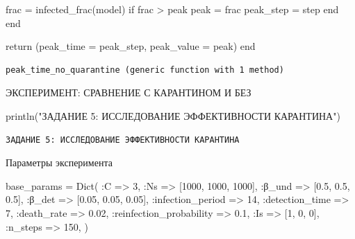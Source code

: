 \documentclass[
  12pt,
  a4paper,
  DIV=11,
  numbers=noendperiod]{scrreprt}
\newenvironment{Shaded}{\begin{snugshade}}{\end{snugshade}}
\newcommand{\ControlFlowTok}[1]{\textcolor[rgb]{0.00,0.23,0.31}{#1}}
\newcommand{\FloatTok}[1]{\textcolor[rgb]{0.68,0.00,0.00}{#1}}
\newcommand{\FunctionTok}[1]{\textcolor[rgb]{0.28,0.35,0.67}{#1}}
\newcommand{\KeywordTok}[1]{\textcolor[rgb]{0.00,0.23,0.31}{#1}}
\newcommand{\NormalTok}[1]{\textcolor[rgb]{0.00,0.23,0.31}{#1}}
\newcommand{\OperatorTok}[1]{\textcolor[rgb]{0.37,0.37,0.37}{#1}}
\newcommand{\StringTok}[1]{\textcolor[rgb]{0.13,0.47,0.30}{#1}}
\begin{document}
\begin{Shaded}
\begin{Highlighting}[]
\NormalTok{        frac }\OperatorTok{=} \FunctionTok{infected\_frac}\NormalTok{(model)}
        \ControlFlowTok{if}\NormalTok{ frac }\OperatorTok{\textgreater{}}\NormalTok{ peak}
\NormalTok{            peak }\OperatorTok{=}\NormalTok{ frac}
\NormalTok{            peak\_step }\OperatorTok{=}\NormalTok{ step}
        \ControlFlowTok{end}
    \ControlFlowTok{end}

    \ControlFlowTok{return}\NormalTok{ (peak\_time }\OperatorTok{=}\NormalTok{ peak\_step, peak\_value }\OperatorTok{=}\NormalTok{ peak)}
\KeywordTok{end}
\end{Highlighting}
\end{Shaded}

\begin{verbatim}
peak_time_no_quarantine (generic function with 1 method)
\end{verbatim}

ЭКСПЕРИМЕНТ: СРАВНЕНИЕ С КАРАНТИНОМ И БЕЗ

\begin{Shaded}
\begin{Highlighting}[]
\FunctionTok{println}\NormalTok{(}\StringTok{"ЗАДАНИЕ 5: ИССЛЕДОВАНИЕ ЭФФЕКТИВНОСТИ КАРАНТИНА"}\NormalTok{)}
\end{Highlighting}
\end{Shaded}

\begin{verbatim}
ЗАДАНИЕ 5: ИССЛЕДОВАНИЕ ЭФФЕКТИВНОСТИ КАРАНТИНА
\end{verbatim}

Параметры эксперимента

\begin{Shaded}
\begin{Highlighting}[]
\NormalTok{base\_params }\OperatorTok{=} \FunctionTok{Dict}\NormalTok{(}
    \OperatorTok{:}\NormalTok{C }\OperatorTok{=\textgreater{}} \FloatTok{3}\NormalTok{,}
    \OperatorTok{:}\NormalTok{Ns }\OperatorTok{=\textgreater{}}\NormalTok{ [}\FloatTok{1000}\NormalTok{, }\FloatTok{1000}\NormalTok{, }\FloatTok{1000}\NormalTok{],}
    \OperatorTok{:}\NormalTok{β\_und }\OperatorTok{=\textgreater{}}\NormalTok{ [}\FloatTok{0.5}\NormalTok{, }\FloatTok{0.5}\NormalTok{, }\FloatTok{0.5}\NormalTok{],}
    \OperatorTok{:}\NormalTok{β\_det }\OperatorTok{=\textgreater{}}\NormalTok{ [}\FloatTok{0.05}\NormalTok{, }\FloatTok{0.05}\NormalTok{, }\FloatTok{0.05}\NormalTok{],}
    \OperatorTok{:}\NormalTok{infection\_period }\OperatorTok{=\textgreater{}} \FloatTok{14}\NormalTok{,}
    \OperatorTok{:}\NormalTok{detection\_time }\OperatorTok{=\textgreater{}} \FloatTok{7}\NormalTok{,}
    \OperatorTok{:}\NormalTok{death\_rate }\OperatorTok{=\textgreater{}} \FloatTok{0.02}\NormalTok{,}
    \OperatorTok{:}\NormalTok{reinfection\_probability }\OperatorTok{=\textgreater{}} \FloatTok{0.1}\NormalTok{,}
    \OperatorTok{:}\NormalTok{Is }\OperatorTok{=\textgreater{}}\NormalTok{ [}\FloatTok{1}\NormalTok{, }\FloatTok{0}\NormalTok{, }\FloatTok{0}\NormalTok{],}
    \OperatorTok{:}\NormalTok{n\_steps }\OperatorTok{=\textgreater{}} \FloatTok{150}\NormalTok{,}
\NormalTok{)}
\end{Highlighting}
\end{Shaded}
\end{document}
